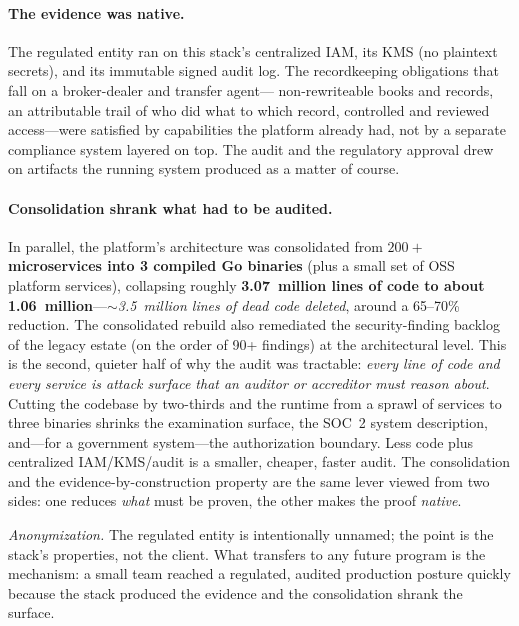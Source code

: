 \documentclass[11pt,letterpaper]{article}
\begin{document}
\paragraph{The evidence was native.} The regulated entity ran on this stack's
centralized IAM, its KMS (no plaintext secrets), and its immutable signed audit log.
The recordkeeping obligations that fall on a broker-dealer and transfer agent---
non-rewriteable books and records, an attributable trail of who did what to which
record, controlled and reviewed access---were satisfied by capabilities the platform
already had, not by a separate compliance system layered on top. The audit and the
regulatory approval drew on artifacts the running system produced as a matter of
course.

\paragraph{Consolidation shrank what had to be audited.} In parallel, the platform's
architecture was consolidated from \textbf{$200{+}$ microservices into 3 compiled Go
binaries} (plus a small set of OSS platform services), collapsing roughly
\textbf{3.07~million lines of code to about 1.06~million}---\emph{$\sim$3.5~million
lines of dead code deleted}, around a 65--70\% reduction. The consolidated rebuild
also remediated the security-finding backlog of the legacy estate (on the order of
90+ findings) at the architectural level. This is the second, quieter half of why the
audit was tractable: \emph{every line of code and every service is attack surface that
an auditor or accreditor must reason about}. Cutting the codebase by two-thirds and
the runtime from a sprawl of services to three binaries shrinks the examination
surface, the SOC~2 system description, and---for a government system---the
authorization boundary. Less code plus centralized IAM/KMS/audit is a smaller,
cheaper, faster audit. The consolidation and the evidence-by-construction property are
the same lever viewed from two sides: one reduces \emph{what} must be proven, the other
makes the proof \emph{native}.

\medskip
\noindent\emph{Anonymization.} The regulated entity is intentionally unnamed; the
point is the stack's properties, not the client. What transfers to any future program
is the mechanism: a small team reached a regulated, audited production posture quickly
because the stack produced the evidence and the consolidation shrank the surface.

\end{document}
